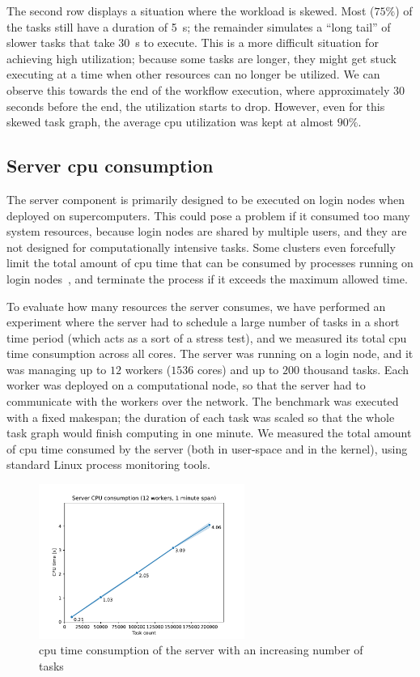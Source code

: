 The second row displays a situation where the workload is skewed. Most ($75\%$) of
the tasks still have a duration of \SI{5}{\second}; the remainder simulates a ``long tail''
of slower tasks that take \SI{30}{\second} to execute. This is a more difficult situation
for achieving high utilization; because some tasks are longer, they might get stuck executing at a
time when other resources can no longer be utilized. We can observe this towards the end of the
workflow execution, where approximately $30$ seconds before the end, the
utilization starts to drop. However, even for this skewed task graph, the average
\gls{cpu} utilization was kept at almost $90\%$.

\subsection{Server \gls{cpu} consumption}
\label{sec:hq-exp-server-cpu-consumption}
The \hyperqueue{} server component is primarily designed to be executed on login nodes
when deployed on supercomputers. This could pose a problem if it consumed too many system
resources, because login nodes are shared by multiple users, and they are not designed for
computationally intensive tasks. Some clusters even forcefully limit the total amount of
\gls{cpu} time that can be consumed by processes running on login
nodes~\cite{leonardo_time_limit}, and terminate the process if it exceeds the maximum allowed time.

To evaluate how many resources the server consumes, we have performed an experiment where the
server had to schedule a large number of tasks in a short time period (which acts as a sort of a
stress test), and we measured its total \gls{cpu} time consumption across all cores.
The server was running on a login node, and it was managing up to $12$ workers
($1536$ cores) and up to $200$ thousand tasks. Each worker was
deployed on a computational node, so that the server had to communicate with the workers over the
network. The benchmark was executed with a fixed makespan; the duration of each task was scaled so
that the whole task graph would finish computing in one minute. We measured the total amount of
\gls{cpu} time consumed by the server (both in user-space and in the kernel), using
standard Linux process monitoring tools.

\begin{figure}[h]
	\centering
	\includegraphics[width=0.6\textwidth]{imgs/hq/charts/server-utilization-tasks}
	\caption{\gls{cpu} time consumption of the \hyperqueue{} server with an increasing
	number of tasks}
	\label{fig:hq-server-cpu-consumption-tasks}
\end{figure}

